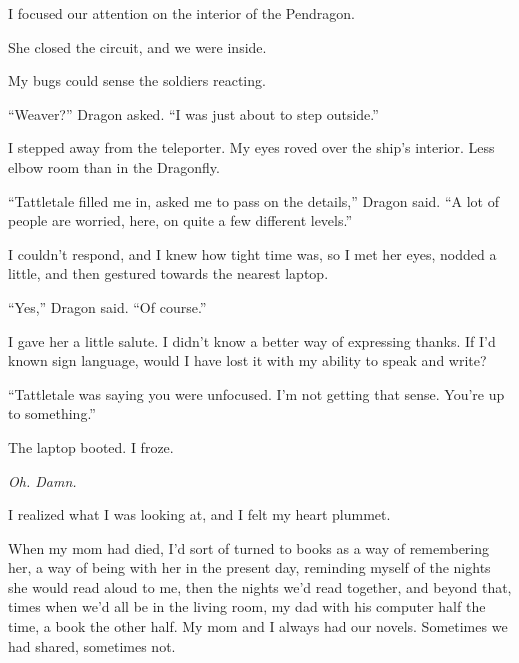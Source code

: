 I focused our attention on the interior of the Pendragon.



She closed the circuit, and we were inside.



My bugs could sense the soldiers reacting.



``Weaver?''  Dragon asked.  ``I was just about to step outside.''



I stepped away from the teleporter.  My eyes roved over the ship's interior.  Less elbow room than in the Dragonfly.



``Tattletale filled me in, asked me to pass on the details,'' Dragon said.  ``A lot of people are worried, here, on quite a few different levels.''



I couldn't respond, and I knew how tight time was, so I met her eyes, nodded a little, and then gestured towards the nearest laptop.



``Yes,'' Dragon said.  ``Of course.''



I gave her a little salute.  I didn't know a better way of expressing thanks.  If I'd known sign language, would I have lost it with my ability to speak and write?



``Tattletale was saying you were unfocused.  I'm not getting that sense.  You're up to something.''



The laptop booted.  I froze.



\emph{Oh.  Damn.}



I realized what I was looking at, and I felt my heart plummet.



When my mom had died, I'd sort of turned to books as a way of remembering her, a way of being with her in the present day, reminding myself of the nights she would read aloud to me, then the nights we'd read together, and beyond that, times when we'd all be in the living room, my dad with his computer half the time, a book the other half.  My mom and I always had our novels.  Sometimes we had shared, sometimes not.




